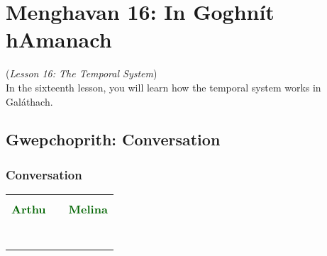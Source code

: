 \section{Menghavan 16: In Goghn\'{i}t hAmanach}
(\textit{Lesson 16: The Temporal System})\\

In the sixteenth lesson, you will learn how the temporal system works in Gal\'{a}thach.

\subsection{Gwepchoprith: Conversation}
\subsubsection{Conversation}

\begin{table}[H]
\centering
    \begin{tabular}{cM{10.0cm}c}
     &  & \\
    \textcolor{darkgreen}{\textbf{Arthu}} &  & \textcolor{darkgreen}{\textbf{Melina}}\\
     &  & \\
     &  & \\
     &  & \\
     &  & \\
     &  & \\
     &  & \\
     &  & 
    \end{tabular}
\end{table}

